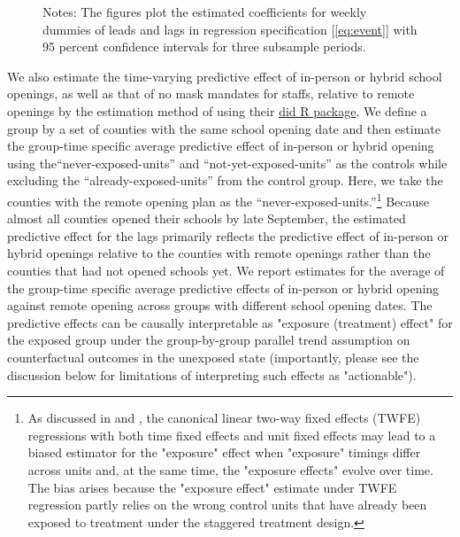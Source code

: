 \documentclass[9pt,twocolumn,twoside,lineno]{pnas-new}
\begin{document}
\begin{figure}[!ht]
{\begin{minipage}{\linewidth}
\begin{tabular}{cc}
        \end{tabular}
  \end{minipage}}
\vspace{-0.2cm}  {\scriptsize
\begin{flushleft}
Notes: The figures plot the estimated coefficients for weekly dummies of leads and lags in regression specification [\ref{eq:event}] with 95 percent confidence intervals for three subsample periods.  \end{flushleft}} \vspace{-0.1cm}
\end{figure}

 We also estimate the time-varying predictive effect of in-person  or hybrid school openings, as well as that of no mask mandates for staffs, relative to remote openings by the estimation method of \cite{Callaway2020} using their \href{https://cran.r-project.org/web/packages/did/vignettes/did-basics.html}{did R package}.
We define a group by a set of counties with the same school opening date and then estimate the group-time specific average predictive effect of in-person or hybrid opening using the``never-exposed-units'' and ``not-yet-exposed-units'' as the controls while excluding the ``already-exposed-units''  from the control group. Here, we take the counties with the remote opening plan as the ``never-exposed-units.''\footnote{As discussed in \cite{Goodman-Bacon2018} and \cite{Sun2020}, the canonical linear two-way fixed effects (TWFE) regressions with both time fixed effects and unit fixed effects may lead to a biased estimator for the "exposure" effect when "exposure" timings differ across units and, at the same time, the "exposure effects" evolve over time. The bias arises because the "exposure effect" estimate under TWFE regression partly relies on the wrong control units that have already been exposed to treatment under the staggered treatment design.}  Because almost all counties opened their schools by late September, the estimated predictive effect for the lags primarily reflects the predictive effect of in-person or hybrid openings relative to the counties with remote openings rather than the counties that had not opened schools yet. We report estimates for the average of the group-time specific average predictive effects of in-person or hybrid opening against remote opening across groups with different school opening dates. The predictive effects can be causally interpretable as "exposure (treatment) effect" for the exposed group under the group-by-group parallel trend assumption \cite{Callaway2020} on counterfactual outcomes in the unexposed state (importantly, please see the discussion below for limitations of interpreting such effects as "actionable").
\end{document}
